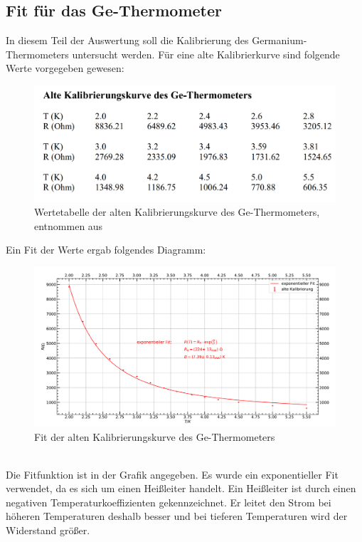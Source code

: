 \documentclass[german,  %
parskip=full,  %
]{scrartcl}
\begin{document}
\subsection{Fit für das Ge-Thermometer}
In diesem Teil der Auswertung soll die Kalibrierung des Germanium-Thermometers untersucht werden. Für eine alte Kalibrierkurve sind folgende Werte vorgegeben gewesen:
\\
\begin{figure}[h!]
\centering
\includegraphics[width=\textwidth]{werte_ge_alt}
\caption{Wertetabelle der alten Kalibrierungskurve des Ge-Thermometers, entnommen aus \cite{3}}
\end{figure}
\newpage
Ein Fit der Werte ergab folgendes Diagramm:
\\
\begin{figure}[h!]
\centering
\includegraphics[width=\textwidth]{Ge_Thermometer_alte_Kalibrierung.pdf}
\caption{Fit der alten Kalibrierungskurve des Ge-Thermometers}
\end{figure}
\\
Die Fitfunktion ist in der Grafik angegeben. Es wurde ein exponentieller Fit verwendet, da es sich um einen Heißleiter handelt. Ein Heißleiter ist durch einen negativen Temperaturkoeffizienten gekennzeichnet. Er leitet den Strom bei höheren Temperaturen deshalb besser und bei tieferen Temperaturen wird der Widerstand größer.
\end{document}
